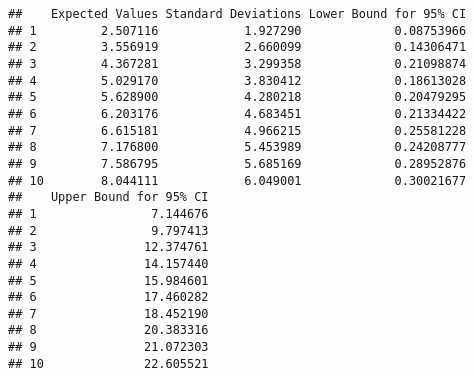 \documentclass[
]{article}
\begin{document}
\begin{verbatim}
##    Expected Values Standard Deviations Lower Bound for 95% CI
## 1         2.507116            1.927290             0.08753966
## 2         3.556919            2.660099             0.14306471
## 3         4.367281            3.299358             0.21098874
## 4         5.029170            3.830412             0.18613028
## 5         5.628900            4.280218             0.20479295
## 6         6.203176            4.683451             0.21334422
## 7         6.615181            4.966215             0.25581228
## 8         7.176800            5.453989             0.24208777
## 9         7.586795            5.685169             0.28952876
## 10        8.044111            6.049001             0.30021677
##    Upper Bound for 95% CI
## 1                7.144676
## 2                9.797413
## 3               12.374761
## 4               14.157440
## 5               15.984601
## 6               17.460282
## 7               18.452190
## 8               20.383316
## 9               21.072303
## 10              22.605521
\end{verbatim}
\end{document}
